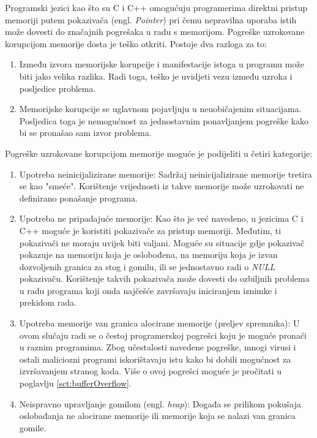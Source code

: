 \documentclass[times, utf8, diplomski, numeric]{fer}
\begin{document}
Programski jezici kao što su C i C++ omogućuju programerima
direktni pristup memoriji putem pokazivača (engl. \emph{Pointer}) 
pri čemu nepravilna uporaba istih može dovesti do značajnih
pogrešaka u radu s memorijom.
Pogreške uzrokovane korupcijom memorije dosta je teško otkriti.
Postoje dva razloga za to:

\begin{enumerate}

\item Između izvora memorijske korupcije i manifestacije istoga u		%
programu može biti jako velika razlika. Radi toga, teško je
uvidjeti vezu između uzroka i posljedice problema.

\item Memorijske korupcije se uglavnom pojavljuju u neuobičajenim
situacijama. Posljedica toga je nemogućnost za jednostavnim
ponavljanjem pogreške kako bi se pronašao sam izvor problema.

\end{enumerate}

Pogreške uzrokovane korupcijom memorije moguće je podijeliti u
četiri kategorije:

\begin{enumerate}

\item Upotreba neinicijalizirane memorije: Sadržaj neinicijalizirane
memorije tretira se kao "smeće". Korištenje					%
vrijednosti iz takve memorije može uzrokovati ne definirano
ponašanje programa.

\item Upotreba ne pripadajuće memorije: Kao što je već navedeno,
u jezicima C i C++ moguće je koristiti pokazivače za pristup
memoriji. Međutim, ti pokazivači ne moraju uvijek biti valjani.
Moguće su situacije gdje pokazivač pokazuje na memoriju koja je
oslobođena, na memoriju koja je izvan dozvoljenih granica za stog
i gomilu, ili se jednostavno radi o \emph{NULL} pokazivaču.
Korištenje takvih pokazivača može dovesti do ozbiljnih problema u
radu programa koji onda najčešće završavaju iniciranjem iznimke i
prekidom rada.

\item Upotreba memorije van granica alocirane memorije (preljev
spremnika): U ovom slučaju radi se o čestoj			%
programerskoj pogrešci koju je moguće pronaći u raznim
programima. Zbog učestalosti navedene pogreške, mnogi virusi i
ostali maliciozni programi iskorištavaju istu kako bi dobili
mogućnost za izvršavanjem stranog koda. Više o ovoj pogrešci
moguće je pročitati u poglavlju \ref{sct:bufferOverflow}.

\item Neispravno upravljanje gomilom (engl. \emph{heap}): Događa				%
se prilikom pokušaja oslobađanja ne alocirane memorije ili
memorije koja se nalazi van granica gomile. 

\end{enumerate}
\end{document}
